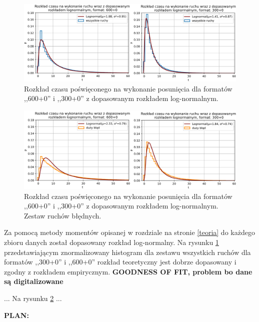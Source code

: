 \documentclass[inzynierska]{pwr_wmat_praca_dyplomowa}
\theoremstyle{plain}
\numberwithin{theorem}{chapter}
\theoremstyle{definition}
\numberwithin{theorem}{chapter}
\begin{document}
\begin{figure}[H]
	\centering
	\includegraphics[width=\textwidth]{rozklad_lognorm.png}
	\caption{Rozkład czasu poświęconego na wykonanie posunięcia dla formatów ,,600+0'' i ,,300+0'' z dopasowanym rozkładem log-normalnym.}
	\label{rys:rozklad_lognorm}
\end{figure}
\begin{figure}[H]
	\centering
	\includegraphics[width=\textwidth]{rozklad_lognorm2.png}
	\caption{Rozkład czasu poświęconego na wykonanie posunięcia dla formatów ,,600+0'' i ,,300+0'' z dopasowanym rozkładem log-normalnym. Zestaw ruchów błędnych.}
	\label{rys:rozklad_lognorm2}
\end{figure}
Za pomocą metody momentów opisanej w rozdziale na stronie \ref{teoria} do każdego zbioru danych został dopasowany rozkład log-normalny. Na rysunku \ref{rys:rozklad_lognorm} przedstawiającym znormalizowany histogram dla zestawu wszystkich ruchów dla formatów ,,300+0'' i ,,600+0'' rozkład teoretyczny jest dobrze dopasowany i zgodny z rozkładem empirycznym. \textbf{GOODNESS OF FIT, problem bo dane są digitalizowane}

... Na rysunku \ref{rys:rozklad_lognorm2}  ... 

\textbf{PLAN:}\\
\end{document}
